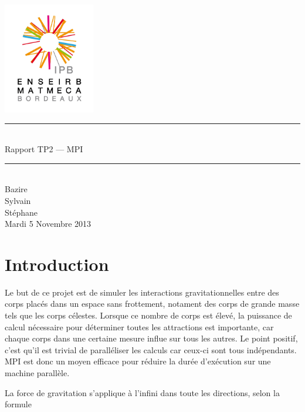 \documentclass[a4paper,11pt]{article}
\begin{document}
\begin{titlepage}
  \begin{center}

    \begin{center}
      \includegraphics[width=4cm]{EM.jpg}
    \end{center}

    \vspace*{1cm}
        
    \rule{0.75\linewidth}{0.7mm}\\[0.4cm]
    {\Huge Rapport TP2 --- MPI\\[0.4cm]}
    \rule{0.75\linewidth}{0.7mm} \\[1.5cm]

    {\Large Bazire \\Sylvain {}\\Stéphane \\[2cm]}
    {\Large Mardi 5 Novembre 2013}
  \end{center}
\end{titlepage}

\tableofcontents
\clearpage
\section{Introduction}


Le but de ce projet est de simuler les interactions gravitationnelles entre des corps placés dans un espace sans frottement, notament des corps de grande masse tels que les corps célestes. Lorsque ce nombre de corps est élevé, la puissance de calcul nécessaire pour déterminer toutes les attractions est importante, car chaque corps dans une certaine mesure influe sur tous les autres. Le point positif, c'est qu'il est trivial de paralléliser les calculs car ceux-ci sont tous indépendants. MPI est donc un moyen efficace pour réduire la durée d'exécution sur une machine parallèle.

La force de gravitation s'applique à l'infini dans toute les directions, selon la formule
\end{document}
